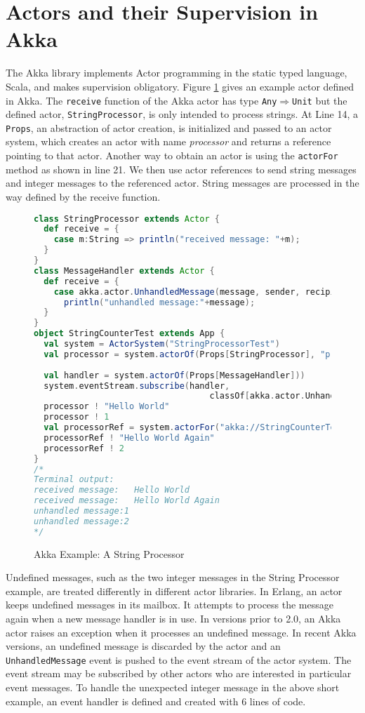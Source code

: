 \section{Actors and their Supervision in Akka}
\label{background}

The Akka library \citep{akka_doc} implements Actor programming in the	
static typed language, Scala, and makes supervision obligatory.  Figure 
\ref{fig:akkastring} gives an example actor defined in Akka.  The {\tt receive} 
function of the Akka actor has type {\tt Any$\Rightarrow$Unit} but the 
defined actor, {\tt StringProcessor}, is only intended to process strings.  At 
Line 14, a {\tt Props}, an abstraction of actor creation, is initialized and 
passed to an actor system, which creates an actor with name  {\it processor} and 
returns a reference pointing to that actor.  Another way to obtain 
an actor is using the {\tt actorFor} method as shown in line 21.  We then use 
actor references to send string messages and integer messages to the 
referenced actor.  String messages are processed in the way defined by the 
receive function.

\begin{figure}[!h]
      \begin{lstlisting}[language=scala]
class StringProcessor extends Actor {
  def receive = {
    case m:String => println("received message: "+m);
  }
}
class MessageHandler extends Actor {
  def receive = {
    case akka.actor.UnhandledMessage(message, sender, recipient) =>
      println("unhandled message:"+message);
  }
}
object StringCounterTest extends App {
  val system = ActorSystem("StringProcessorTest")
  val processor = system.actorOf(Props[StringProcessor], "processor")
  
  val handler = system.actorOf(Props[MessageHandler]))
  system.eventStream.subscribe(handler,
                                   classOf[akka.actor.UnhandledMessage]);
  processor ! "Hello World"
  processor ! 1
  val processorRef = system.actorFor("akka://StringCounterTest/user/processor")
  processorRef ! "Hello World Again"
  processorRef ! 2
}
/*
Terminal output:
received message:	Hello World
received message:	Hello World Again
unhandled message:1
unhandled message:2
*/
    \end{lstlisting}
    \caption{Akka Example: A String Processor}
 \label{fig:akkastring}    
\end{figure}

Undefined messages, such as the two integer messages in the String Processor 
example, are treated differently in different actor libraries.  In
Erlang, an actor keeps undefined messages in its mailbox.  It attempts to 
process the message again when a new message handler is in use.  In versions 
prior to
2.0, an Akka actor raises an exception when it processes an undefined message.
In recent Akka versions, an undefined message is discarded by the actor and an
{\tt UnhandledMessage} event is pushed to the event stream of the actor system.
The event stream may be subscribed by other actors who are interested in
particular event messages.  To handle the unexpected integer message in the
above short example, an event handler is defined and created with 6 lines of 
code.

